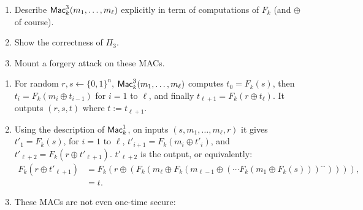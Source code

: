 \begin{enumerate}
	\item Describe $\operatorname{\mathsf{Mac}}_k^3(m_1,\ldots,m_\ell)$ explicitly in term of computations
	of $F_k$ (and $\oplus$ of course).
	\item Show the correctness of $\Pi_3$.
	\item Mount a forgery attack on these MACs.
\end{enumerate}

\begin{solution}
\begin{enumerate}
		\item For random $r,s\leftarrow \{0,1\}^n$, 
		$\operatorname{\mathsf{Mac}}^3_k(m_1,\ldots,m_\ell)$ computes $t_0=F_k(s)$, then $t_i=F_k(m_i \oplus t_{i-1})$ for $i=1$ to $\ell$, and finally 
		$t_{\ell+1}=F_k(r\oplus t_\ell)$. 
		It outputs $(r,s,t)$ where $t:=t_{\ell+1}$.
	
		
		\item Using the description of $\operatorname{\mathsf{Mac}}^1_k$, on inputs $(s,m_1,\ldots,m_\ell,r)$ it gives $t'_1=F_k(s)$, for $i=1$ to $\ell$, $t'_{i+1}=F_k(m_i \oplus t'_i)$, and $t'_{\ell+2}=F_k(r \oplus t'_{\ell+1})$. $t'_{\ell+2}$ is the output, or equivalently:
		\begin{align*}
		F_k(r \oplus t'_{\ell+1})&=F_k(r \oplus (F_k(m_\ell \oplus F_k( m_{\ell-1} \oplus( \cdots F_k(m_1\oplus F_k(s)) )^{\ldots}         )))),\\
		&=t.
		\end{align*}
		
		
		
		\item These MACs are not even one-time secure:
	\end{enumerate}
\end{solution}

